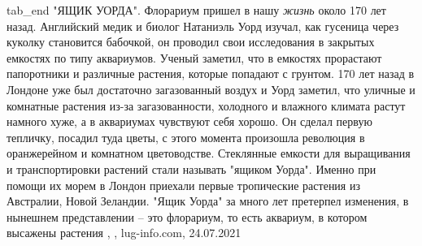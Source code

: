   tab_end
\fi
"ЯЩИК УОРДА". Флорариум пришел в нашу \emph{жизнь} около 170 лет назад. Английский
медик и биолог Натаниэль Уорд изучал, как гусеница через куколку становится
бабочкой, он проводил свои исследования в закрытых емкостях по типу аквариумов.
Ученый заметил, что в емкостях прорастают папоротники и различные растения,
которые попадают с грунтом. 170 лет назад в Лондоне уже был достаточно
загазованный воздух и Уорд заметил, что уличные и комнатные растения из-за
загазованности, холодного и влажного климата растут намного хуже, а в
аквариумах чувствуют себя хорошо. Он сделал первую тепличку, посадил туда
цветы, с этого момента произошла революция в оранжерейном и комнатном
цветоводстве. Стеклянные емкости для выращивания и транспортировки растений
стали называть "ящиком Уорда". Именно при помощи их морем в Лондон приехали
первые тропические растения из Австралии, Новой Зеландии. "Ящик Уорда" за много
лет претерпел изменения, в нынешнем представлении – это флорариум, то есть
аквариум, в котором высажены растения
, 
, lug-info.com, 24.07.2021
